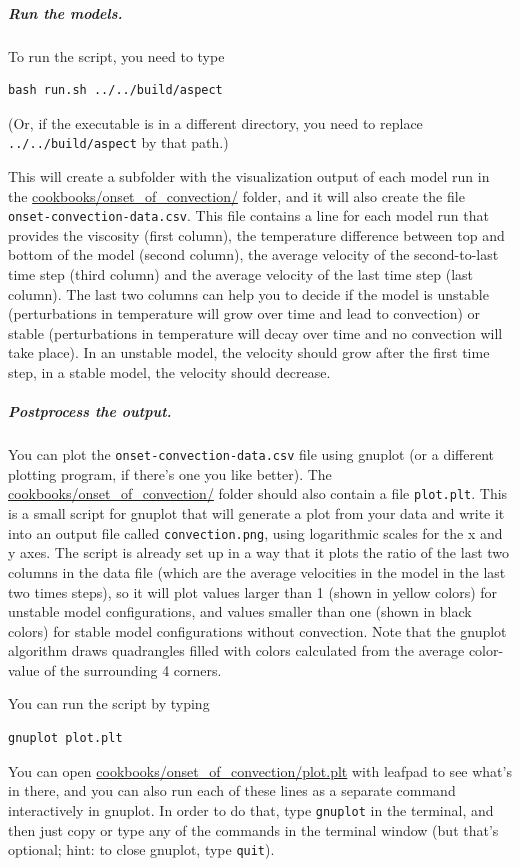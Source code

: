 \subparagraph{Run the models.}
To run the script, you need to type 
\begin{verbatim}
bash run.sh ../../build/aspect
\end{verbatim}
(Or, if the \aspect{} executable is in a different directory, you need to replace \texttt{../../build/aspect} by that path.)

This will create a subfolder with the visualization output of each model run in the \url{cookbooks/onset_of_convection/} folder, 
and it will also create the file \texttt{onset-convection-data.csv}. This file contains a line for each model run that provides
the viscosity (first column), the temperature difference between top and bottom of the model (second column), the average velocity of the second-to-last time step (third column) and the average velocity of the last time step (last column). 
The last two columns can help you to decide if the model is unstable (perturbations in temperature will grow over time and lead to convection) or stable (perturbations in temperature will decay over time and no convection will take place). 
In an unstable model, the velocity should grow after the first time step, in a stable model, the velocity should decrease. 

\subparagraph{Postprocess the output.}
You can plot the \texttt{onset-convection-data.csv} file using gnuplot (or a different plotting program, if there's one you like better). The \url{cookbooks/onset_of_convection/} folder should also contain a file \texttt{plot.plt}. This is a small script for gnuplot that will generate a plot from your data and write it into an output file called \texttt{convection.png}, using logarithmic scales for the x and y axes. The script is already set up in a way that it plots the ratio of the last two columns in the data file (which are the average velocities in the model in the last two times steps), so it will plot values larger than 1 (shown in yellow colors) for unstable model configurations, and values smaller than one (shown in black colors) for stable model configurations without convection. 
Note that the gnuplot algorithm draws quadrangles filled with colors calculated from the average color-value of the surrounding 4 corners.

You can run the script by typing 
\begin{verbatim}
gnuplot plot.plt
\end{verbatim}

You can open \url{cookbooks/onset_of_convection/plot.plt} with leafpad to see what's in there, and you can also run each of these lines as a separate command interactively in gnuplot. In order to do that, type \texttt{gnuplot} in the terminal, and then just copy or type any of the commands in the terminal window (but that's optional; hint: to close gnuplot, type \texttt{quit}). 

